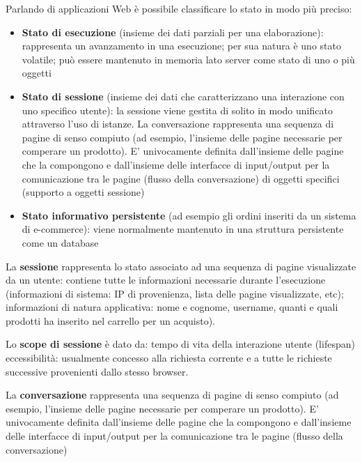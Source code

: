     Parlando di applicazioni Web è possibile classificare lo stato in modo più preciso:
    
    \begin{itemize}
        \item \textbf{Stato di esecuzione} (insieme dei dati parziali per una
        elaborazione): rappresenta un avanzamento in una
        esecuzione; per sua natura è uno stato volatile; può essere
        mantenuto in memoria lato server come stato di uno o più
        oggetti
        
        \item \textbf{Stato di sessione} (insieme dei dati che caratterizzano una
        interazione con uno specifico utente): la sessione viene
        gestita di solito in modo unificato attraverso l’uso di istanze. La conversazione rappresenta una sequenza di pagine di senso
        compiuto (ad esempio, l’insieme delle pagine necessarie per comperare
        un prodotto). E' univocamente definita dall'insieme delle pagine che la compongono e
        dall’insieme delle interfacce di input/output per la comunicazione tra le
        pagine (flusso della conversazione) di oggetti specifici (supporto a oggetti sessione)
        
        \item \textbf{Stato informativo persistente} (ad esempio gli ordini
        inseriti da un sistema di e-commerce): viene normalmente
        mantenuto in una struttura persistente come un database 
    \end{itemize}
    
    La \textbf{sessione} rappresenta lo stato associato ad una sequenza di pagine visualizzate da un utente: contiene tutte le informazioni necessarie durante l’esecuzione (informazioni di sistema: IP di provenienza, lista delle pagine visualizzate, etc); informazioni di natura applicativa: nome e cognome, username, quanti e quali prodotti ha inserito nel carrello per un acquisto).
    
    \vspace{3mm}
    
    Lo \textbf{scope di sessione} è dato da: tempo di vita della interazione utente (lifespan) eccessibilità: usualmente concesso alla richiesta corrente e a tutte le richieste successive provenienti dallo stesso browser.
    
    \vspace{3mm}
    
    La \textbf{conversazione} rappresenta una sequenza di pagine di senso compiuto (ad esempio, l’insieme delle pagine necessarie per comperare
    un prodotto). E' univocamente definita dall’insieme delle pagine che la compongono e dall’insieme delle interfacce di input/output per la comunicazione tra le pagine (flusso della conversazione) 
    
